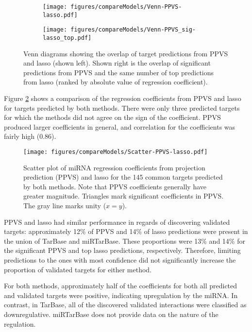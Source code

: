 \begin{figure}[!h]
  \centering
  \begin{subfigure}{.45\textwidth}
    \centering
    \texttt{[image: figures/compareModels/Venn-PPVS-lasso.pdf]}
  \end{subfigure}
  \begin{subfigure}{.45\textwidth}
    \centering
    \texttt{[image: figures/compareModels/Venn-PPVS\_sig-lasso\_top.pdf]}
  \end{subfigure}

  \caption{Venn diagrams showing the overlap of target predictions from PPVS
  and lasso (shown left). Shown right is the overlap of significant predictions
  from PPVS and the same number of top predictions from lasso (ranked by
  absolute value of regression coefficient).}
  \label{fig:venn}
\end{figure}

Figure \ref{fig:scatter-ppvs-lasso} shows a comparison of the regression
coefficients from PPVS and lasso for targets predicted by both methods. There
were only three predicted targets for which the methods did not agree on the
sign of the coefficient. PPVS produced larger coefficients in general, and
correlation for the coefficients was fairly high ($0.86$).

\begin{figure}[htb]
  \centering
  \texttt{[image: figures/compareModels/Scatter-PPVS-lasso.pdf]}
  \caption{Scatter plot of miRNA regression coefficients from projection
  prediction (PPVS) and lasso for the 145 common targets predicted by both methods.
  Note that PPVS coefficients generally have greater magnitude. Triangles
  mark significant coefficients in PPVS. The gray
  line marks unity ($x=y$).}
  \label{fig:scatter-ppvs-lasso}
\end{figure}

PPVS and lasso had similar performance in regards of discovering validated
targets: approximately 12\% of PPVS and 14\% of lasso predictions were present
in the union of TarBase and miRTarBase. These proportions were 13\% and 14\% for
the significant PPVS and top lasso predictions, respectively. Therefore,
limiting predictions to the ones with most confidence did not significantly increase
the proportion of validated targets for either method.

For both methods, approximately half of the coefficients for both all
predicted and validated targets were positive, indicating upregulation by the
miRNA. In contrast, in TarBase, all of the discovered validated interactions
were classified as downregulative. miRTarBase does not provide data on the
nature of the regulation.
